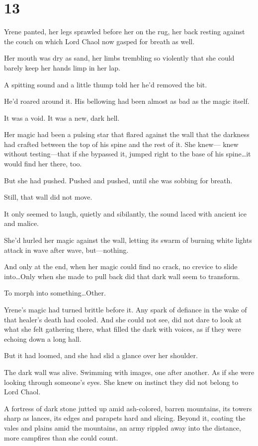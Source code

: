 
\chapter{13}

Yrene panted, her legs sprawled before her on the rug, her back resting against the couch on which Lord Chaol now gasped for breath as well.

Her mouth was dry as sand, her limbs trembling so violently that she could barely keep her hands limp in her lap.

A spitting sound and a little thump told her he'd removed the bit.

He'd roared around it.
His bellowing had been almost as bad as the magic itself.

It was a void.
It was a new, dark hell.

Her magic had been a pulsing star that flared against the wall that the darkness had crafted between the top of his spine and the rest of it.
She knew--- knew without testing---that if she bypassed it, jumped right to the base of his spine\ldots it would find her there, too.

But she had pushed.
Pushed and pushed, until she was sobbing for breath.

Still, that wall did not move.

It only seemed to laugh, quietly and sibilantly, the sound laced with ancient ice and malice.

She'd hurled her magic against the wall, letting its swarm of burning white lights attack in wave after wave, but---nothing.

And only at the end, when her magic could find no crack, no crevice to slide into\ldots Only when she made to pull back did that dark wall seem to transform.

To morph into something\ldots Other.

Yrene's magic had turned brittle before it.
Any spark of defiance in the wake of that healer's death had cooled.
And she could not see, did not dare to look at what she felt gathering there, what filled the dark with voices, as if they were echoing down a long hall.

But it had loomed, and she had slid a glance over her shoulder.

The dark wall was alive.
Swimming with images, one after another.
As if she were looking through someone's eyes.
She knew on instinct they did not belong to Lord Chaol.

A fortress of dark stone jutted up amid ash-colored, barren mountains, its towers sharp as lances, its edges and parapets hard and slicing.
Beyond it, coating the vales and plains amid the mountains, an army rippled away into the distance, more campfires than she could count.

